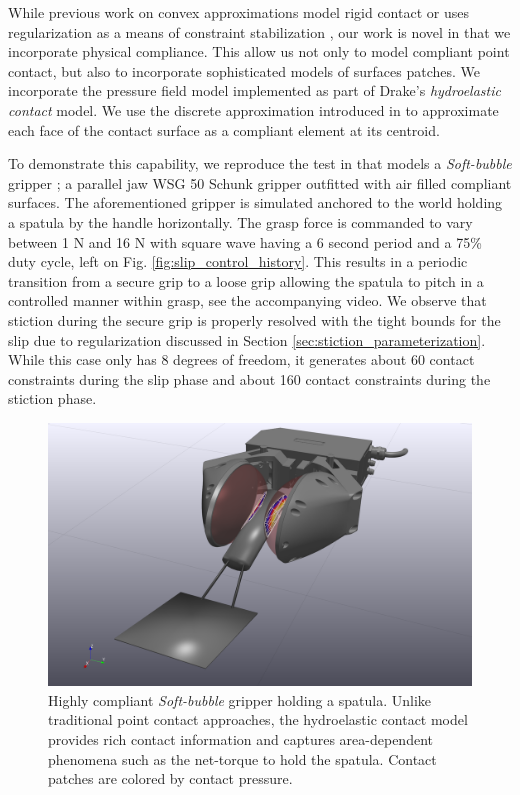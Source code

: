While previous work on convex approximations model rigid contact
\cite{bib:anitescu2006,bib:mazhar2014} or uses regularization as a means of
constraint stabilization \cite{bib:todorov2014}, our work is novel in that we
incorporate physical compliance. This allow us not only to model compliant point
contact, but also to incorporate sophisticated models of surfaces patches. We
incorporate the pressure field model \cite{bib:elandt2019pressure} implemented
as part of Drake's \cite{bib:drake} \emph{hydroelastic contact} model. We use
the discrete approximation introduced in \cite{bib:masterjohn2021discrete}
to approximate each face of the contact surface as a compliant element at its
centroid.

To demonstrate this capability, we reproduce the test in \cite{bib:masterjohn2021discrete} that models a \emph{Soft-bubble} gripper
\cite{bib:kuppuswamy2020soft}; a parallel jaw WSG 50 Schunk gripper outfitted
with air filled compliant surfaces. The aforementioned gripper is simulated
anchored to the world holding a spatula by the handle horizontally. The grasp
force is commanded to vary between 1 N and 16 N with square wave having a 6
second period and a 75\% duty cycle, left on Fig.
\ref{fig:slip_control_history}. This results in a periodic transition from a
secure grip to a loose grip allowing the spatula to pitch in a controlled manner
within grasp, see the accompanying video. We observe that stiction during the
secure grip is properly resolved with the tight bounds for the slip due to
regularization discussed in Section \ref{sec:stiction_parameterization}. While
this case only has 8 degrees of freedom, it generates about 60 contact
constraints during the slip phase and about 160 contact constraints during the
stiction phase.

\begin{figure}[!h]
	\centering
	\includegraphics[width=0.9\columnwidth]{figures/slip_control/slip_control_single_frame.png}
	\caption{\label{fig:slip_control_frame} 
	Highly compliant \emph{Soft-bubble} gripper \cite{bib:kuppuswamy2020soft}
	holding a spatula. Unlike traditional point contact approaches, the
	hydroelastic contact model provides rich contact information and captures
	area-dependent phenomena such as the net-torque to hold the spatula. Contact
	patches are colored by contact pressure.}
\end{figure}

